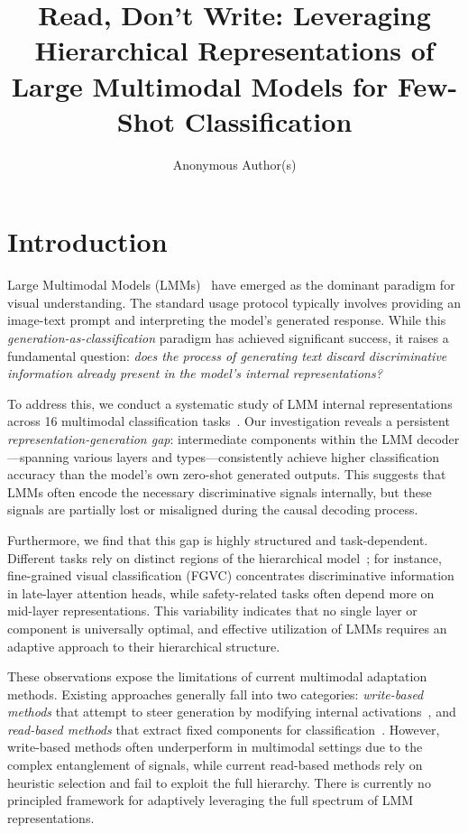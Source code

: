 \documentclass[sigconf,review,anonymous,9pt,table]{acmart}
\title{Read, Don't Write: Leveraging Hierarchical Representations of Large Multimodal Models for Few-Shot Classification}
\author{Anonymous Author(s)}
\affiliation{
  \institution{Anonymous Institution}
  \city{Anonymous City}
  \country{Anonymous Country}
}
\begin{document}
\maketitle

\section{Introduction}

Large Multimodal Models (LMMs)~\cite{achiam2023gpt, wang2024qwen2, li2024llava, team2024gemini} have emerged as the dominant paradigm for visual understanding. 
The standard usage protocol typically involves providing an image-text prompt and interpreting the model's generated response. 
While this \emph{generation-as-classification} paradigm has achieved significant success, it raises a fundamental question: \emph{does the process of generating text discard discriminative information already present in the model's internal representations?}

To address this, we conduct a systematic study of LMM internal representations across 16 multimodal classification tasks~\cite{fu2024blink, hsieh2023sugarcrepe, lin2024evaluating}. 
Our investigation reveals a persistent \emph{representation-generation gap}: intermediate components within the LMM decoder—spanning various layers and types—consistently achieve higher classification accuracy than the model’s own zero-shot generated outputs. 
This suggests that LMMs often encode the necessary discriminative signals internally, but these signals are partially lost or misaligned during the causal decoding process.

Furthermore, we find that this gap is highly structured and task-dependent. 
Different tasks rely on distinct regions of the hierarchical model~\cite{mitra2025enhancing, ma2026and, kovaleva2019revealing}; for instance, fine-grained visual classification (FGVC) concentrates discriminative information in late-layer attention heads, while safety-related tasks often depend more on mid-layer representations. 
This variability indicates that no single layer or component is universally optimal, and effective utilization of LMMs requires an adaptive approach to their hierarchical structure.

These observations expose the limitations of current multimodal adaptation methods. 
Existing approaches generally fall into two categories: \emph{write-based methods} that attempt to steer generation by modifying internal activations~\cite{huang2024multimodal, jiang2025mimic, xu2026steering, sheng2025illusion}, and \emph{read-based methods} that extract fixed components for classification~\cite{mitra2025enhancing, singhal2023learning}. 
However, write-based methods often underperform in multimodal settings due to the complex entanglement of signals, while current read-based methods rely on heuristic selection and fail to exploit the full hierarchy. 
There is currently no principled framework for adaptively leveraging the full spectrum of LMM representations.
\end{document}
